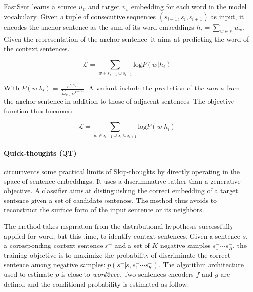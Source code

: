 FastSent learns a source $u_w$ and target $v_w$ embedding for each word in the model vocabulary. Given a tuple of consecutive sequences $(s_{i-1}, s_i, s_{i+1})$ as input, it encodes the anchor sentence as the sum of its word embeddings $h_i = \sum_{w \in s_i}u_w$. Given the representation of the anchor sentence, it aims at predicting the word of the context sentences. 

\begin{equation*}
    \mathcal{L} = \sum_{w \in s_{i-1} \cup s_{i+1}} \text{log} P(w | h_i)
\end{equation*}

With $P(w | h_i) = \frac{e^{h_i u_w}}{\sum_{v \in V}e^{h_i u_v}}$. A variant include the prediction of the words from the anchor sentence in addition to those of adjacent sentences. The objective function thus becomes:

\begin{equation*}
    \mathcal{L} = \sum_{w \in s_{i-1} \cup s_{i} \cup s_{i+1}} \text{log} P(w | h_i)
\end{equation*}

\paragraph{Quick-thoughts (QT)} \textcite{logeswaran_18} circumvents some practical limits of Skip-thoughts by directly operating in the space of sentence embeddings. It uses a discriminative rather than a generative objective. A classifier aims at distinguishing the correct embedding of a target sentence given a set of candidate sentences. The method thus avoids to reconstruct the surface form of the input sentence or its neighbors.

The method takes inspiration from the distributional hypothesis successfully applied for word, but this time, to identify context sentences. Given a sentence $s$, a corresponding context sentence $s^+$ and a set of $K$ negative samples $s^-_1 \cdots s^-_K$, the training objective is to maximize the probability of discriminate the correct sentence among negative samples: $p(s^+ | s, s^-_1 \cdots s^-_K)$. The algorithm architecture used to estimate $p$ is close to \textsl{word2vec}. Two sentences encoders $f$ and $g$ are defined and the conditional probability is estimated as follow:

